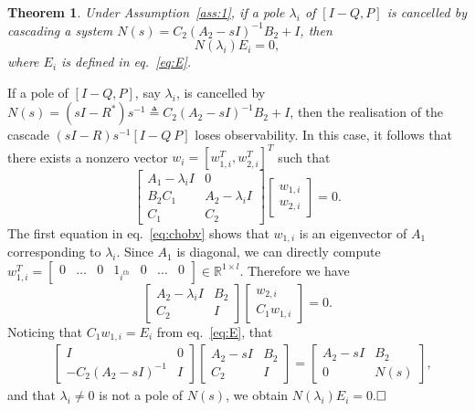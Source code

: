 \documentclass[twocolumn,12pt]{autart}
\theoremstyle{plain}
\newtheorem{theorem}{Theorem}
\newenvironment{proof}[1][Proof]{\begin{trivlist} \item[\hskip \labelsep {\bfseries #1}]}{\end{trivlist}}
\begin{document}
\begin{theorem}\label{thm:cancelp}
Under Assumption~\ref{ass:1}, if a pole $\lambda_i$ of $[I-{Q},{P}]$ is cancelled by cascading a system ${N}(s)={C}_2({A}_2-sI)^{-1}{B}_2+{I}$, then\begin{equation}\label{eq:reqne}
{N}(\lambda_i){E}_i={0},
\end{equation}
where $E_i$ is defined in eq.~\eqref{eq:E}.
\end{theorem}
\begin{proof}
If a pole of $[I-Q,P]$, say $\lambda_i$, is cancelled by ${N}(s)=(s{I}-{R}^*)s^{-1}\triangleq {C}_2({A}_2-sI)^{-1}{B}_2+{I}$, then the realisation of the
cascade $(s{I}-{R})s^{-1}[I-{Q}~{P}]$ loses
observability. In this case, it follows that there exists a nonzero vector
${w}_i= [{w}_{1,i}^T, {w}_{2,i}^T]^T$ such that
\begin{equation}\label{eq:chobv}
\begin{bmatrix} {A}_1-\lambda_i{I} & {0} \\ {B}_2
  {C}_1 & {A}_2-\lambda_i{I} \\ {C}_1& {C}_2
\end{bmatrix}\begin{bmatrix} {w}_{1,i}\\ {w}_{2,i} \end{bmatrix}={0}.
\end{equation}
The first equation in eq.~\eqref{eq:chobv} shows that ${w}_{1,i}$ is an eigenvector of
${A}_1$ corresponding to $\lambda_i$. Since
${A}_1$ is diagonal, we can directly compute ${w}^T_{1,i}=\begin{bmatrix}0&\ldots&0&1_{i^{th}}&0&\ldots&0\end{bmatrix} \in
\mathbb{R}^{1 \times l}$. Therefore we have
$$\begin{bmatrix} {A}_2-\lambda_i{I} & {B}_2\\ {C}_2& {I}
\end{bmatrix}\begin{bmatrix} {w}_{2,i} \\
  {C}_1{w}_{1,i} \end{bmatrix}={0}.$$
Noticing that ${C}_1{w}_{1,i}= {E}_{i}$ from eq.~\eqref{eq:E}, that
\begin{align*}
&\begin{bmatrix} {I} & {0} \\
-{C}_2({A}_2-s{I})^{-1}& {I}
\end{bmatrix}\begin{bmatrix} {A}_2-s{I} & {B}_2\\ {C}_2& {I}
\end{bmatrix}
=\begin{bmatrix} {A}_2-s{I} & {B}_2\\ {0} &
{N(s)}
\end{bmatrix},
\end{align*}
and that $\lambda_i\neq0$ is not a pole of $N(s)$, we obtain
${N}(\lambda_i){E}_i={0}.$$\hfill \square$
\end{proof}
\end{document}
